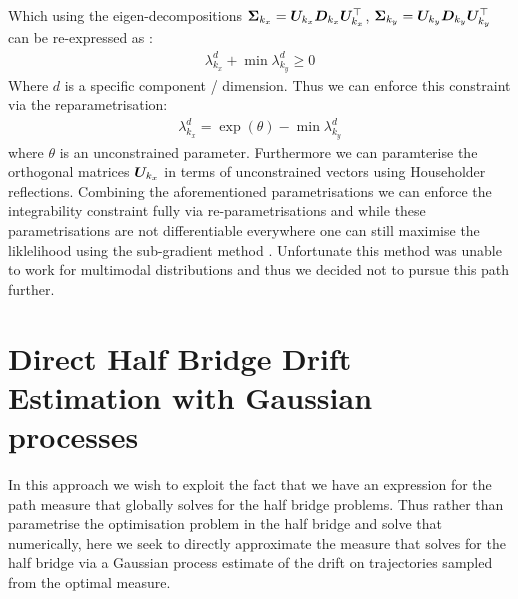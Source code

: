 \documentclass[a4paper,12pt,twoside,openright]{report}
\theoremstyle{definition}
\begin{document}
Which using the eigen-decompositions ${\bm{\Sigma}}_{k_x}={\bm{U}}_{k_x} {\bm{D}}_{k_x} {\bm{U}}^{\top}_{k_x}$,  ${\bm{\Sigma}}_{k_y}={\bm{U}}_{k_y} {\bm{D}}_{k_y} {\bm{U}}^{\top}_{k_y}$ can be re-expressed as : 
\begin{align*}
  \lambda_{k_x}^d + \min\lambda_{k_y}^d \geq 0 
\end{align*}
Where $d$ is a specific component / dimension. Thus we can enforce this constraint via the reparametrisation:
\begin{align*}
   \lambda_{k_x}^d = \exp(\theta) - \min\lambda_{k_y}^d 
\end{align*}
where  $\theta$ is an unconstrained parameter. Furthermore we can paramterise the orthogonal matrices ${\bm{U}}_{k_x}$ in terms of unconstrained vectors using Householder reflections. Combining the aforementioned parametrisations we can enforce the integrability constraint  fully via re-parametrisations and while these parametrisations are not differentiable everywhere one can still maximise the liklelihood using the sub-gradient method \citep{shor1991development}. Unfortunate this method was unable to work for multimodal distributions and thus we decided not to pursue this path further.

\section{Direct Half Bridge Drift Estimation with Gaussian processes}

In this approach we wish to exploit the fact that we have an expression for the path measure that globally solves for the half bridge problems.  Thus rather than parametrise the optimisation problem in the half bridge and solve that numerically, here we seek to directly approximate the measure that solves for the half bridge via a Gaussian process estimate of the drift on trajectories sampled from the optimal measure.
\end{document}
